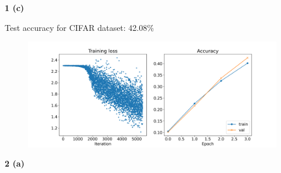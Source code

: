\documentclass[12 pt]{article}        	%
\begin{document}

\textbf{1 (c)} 

Test accuracy for CIFAR dataset: 42.08\%

\begin{figure}[h!]
  \includegraphics[width=\linewidth]{cnn.png}
\end{figure}


\textbf{2 (a)} 
\end{document}
